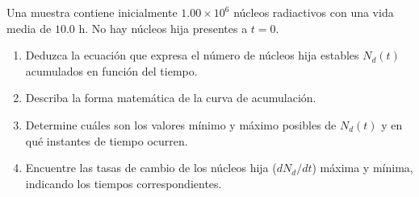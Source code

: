 \item Una muestra contiene inicialmente $1.00 \times 10^6$ núcleos radiactivos con una vida media de $10.0\text{ h}$. No hay núcleos hija presentes a $t = 0$.
\begin{enumerate}
    \item Deduzca la ecuación que expresa el número de núcleos hija estables $N_d(t)$ acumulados en función del tiempo.
    \item Describa la forma matemática de la curva de acumulación.
    \item Determine cuáles son los valores mínimo y máximo posibles de $N_d(t)$ y en qué instantes de tiempo ocurren.
    \item Encuentre las tasas de cambio de los núcleos hija ($dN_d/dt$) máxima y mínima, indicando los tiempos correspondientes.
\end{enumerate}